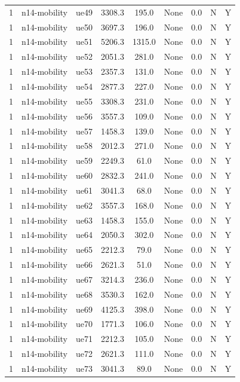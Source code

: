 \begin{table}[ht]
\begin{tabular}{|c|c|c|c|c|c|c|c|c|}
1 & n14-mobility & ue49 & 3308.3 & 195.0 & None & 0.0 & N & Y \\
1 & n14-mobility & ue50 & 3697.3 & 196.0 & None & 0.0 & N & Y \\
1 & n14-mobility & ue51 & 5206.3 & 1315.0 & None & 0.0 & N & Y \\
1 & n14-mobility & ue52 & 2051.3 & 281.0 & None & 0.0 & N & Y \\
1 & n14-mobility & ue53 & 2357.3 & 131.0 & None & 0.0 & N & Y \\
1 & n14-mobility & ue54 & 2877.3 & 227.0 & None & 0.0 & N & Y \\
1 & n14-mobility & ue55 & 3308.3 & 231.0 & None & 0.0 & N & Y \\
1 & n14-mobility & ue56 & 3557.3 & 109.0 & None & 0.0 & N & Y \\
1 & n14-mobility & ue57 & 1458.3 & 139.0 & None & 0.0 & N & Y \\
1 & n14-mobility & ue58 & 2012.3 & 271.0 & None & 0.0 & N & Y \\
1 & n14-mobility & ue59 & 2249.3 & 61.0 & None & 0.0 & N & Y \\
1 & n14-mobility & ue60 & 2832.3 & 241.0 & None & 0.0 & N & Y \\
1 & n14-mobility & ue61 & 3041.3 & 68.0 & None & 0.0 & N & Y \\
1 & n14-mobility & ue62 & 3557.3 & 168.0 & None & 0.0 & N & Y \\
1 & n14-mobility & ue63 & 1458.3 & 155.0 & None & 0.0 & N & Y \\
1 & n14-mobility & ue64 & 2050.3 & 302.0 & None & 0.0 & N & Y \\
1 & n14-mobility & ue65 & 2212.3 & 79.0 & None & 0.0 & N & Y \\
1 & n14-mobility & ue66 & 2621.3 & 51.0 & None & 0.0 & N & Y \\
1 & n14-mobility & ue67 & 3214.3 & 236.0 & None & 0.0 & N & Y \\
1 & n14-mobility & ue68 & 3530.3 & 162.0 & None & 0.0 & N & Y \\
1 & n14-mobility & ue69 & 4125.3 & 398.0 & None & 0.0 & N & Y \\
1 & n14-mobility & ue70 & 1771.3 & 106.0 & None & 0.0 & N & Y \\
1 & n14-mobility & ue71 & 2212.3 & 105.0 & None & 0.0 & N & Y \\
1 & n14-mobility & ue72 & 2621.3 & 111.0 & None & 0.0 & N & Y \\
1 & n14-mobility & ue73 & 3041.3 & 89.0 & None & 0.0 & N & Y \\

\end{tabular}
\end{table}

